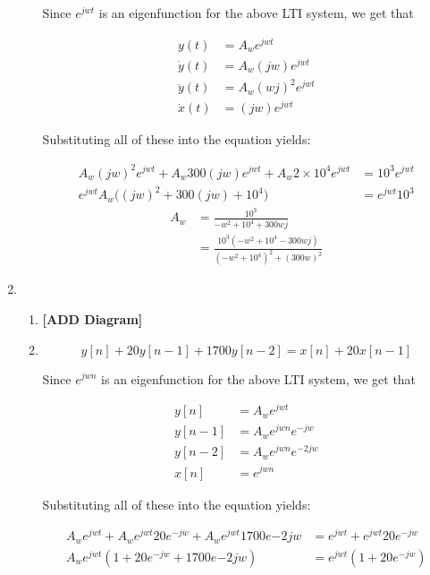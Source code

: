 \documentclass[]{article}
\begin{document}
\begin{enumerate}
\begin{enumerate}
    Since \(e^{jwt}\) is an eigenfunction for the above LTI system, we
    get that

    \begin{align*}
        y(t) &= A_w e^{jwt} \\
        \dot{y}(t) &= A_w (jw) e^{jwt} \\
        \ddot{y}(t) &= A_w (wj)^2 e^{jwt} \\
        \dot{x}(t) &= (jw) e^{jwt}
    \end{align*}

    Substituting all of these into the equation yields:

    \begin{align*}
        A_w (jw)^2 e^{jwt} + A_w 300 (jw) e^{jwt} + A_w 2 \times 10^4 e^{jwt} &= 
            10^3 e^{jwt} \\
        e^{jwt} A_w \Big( (jw)^2 + 300(jw) + 10^4 \Big) &= e^{jwt} 10^3
    \end{align*}\begin{align*}
        A_w &= \frac{10^3}{-w^2 + 10^4 + 300 w j} \\
            &= \boxed{\frac{10^3 (-w^2 + 10^4 - 300wj)}{ (-w^2 + 10^4)^2 + (300 w)^2}}
    \end{align*}
  \end{enumerate}
\item
  \begin{enumerate}
  \def\labelenumii{\alph{enumii}.}
  \item
    \textbf{{[}ADD Diagram{]}}
  \item
    \[
        y[n] + 20 y[n - 1] + 1700 y[n - 2] = x[n] + 20x[n-1]
    \]

    Since \(e^{jwn}\) is an eigenfunction for the above LTI system, we
    get that

    \begin{align*}
        y[n] &= A_w e^{jwt} \\
        y[n - 1] &= A_w e^{jwn} e^{-jw} \\
        y[n - 2] &= A_w  e^{jwn} e^{-2jw} \\
        x[n] &= e^{jwn}
    \end{align*}

    Substituting all of these into the equation yields:

    \begin{align*}
        A_w e^{jwt} + A_w e^{jwt}20  e^{-jw} + A_w e^{jwt} 1700 e{-2jw} &= 
            e^{jwt} + e^{jwt} 20 e^{-jw} \\
        A_w e^{jwt}(1 +  20  e^{-jw} + 1700 e{-2jw}) &=
            e^{jwt}(1 + 20e^{-jw})
    \end{align*}


\end{enumerate}
\end{enumerate}
\end{document}
